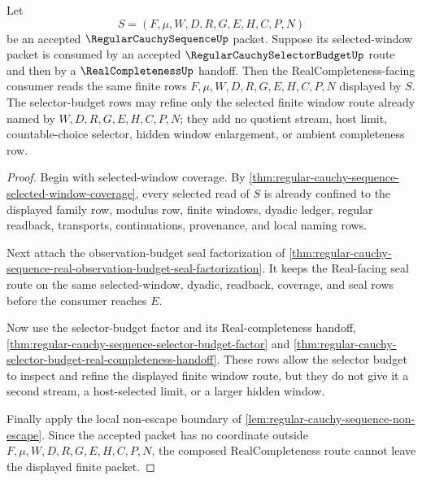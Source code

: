 \begin{theorem}
\label{thm:regular-cauchy-sequence-selector-budget-real-completeness-route}
Let
$$
S=(F,\mu,W,D,R,G,E,H,C,P,N)
$$
be an accepted $\RegularCauchySequenceUp$ packet. Suppose its selected-window packet is consumed by an accepted $\RegularCauchySelectorBudgetUp$ route and then by a $\RealCompletenessUp$ handoff. Then the RealCompleteness-facing consumer reads the same finite rows $F,\mu,W,D,R,G,E,H,C,P,N$ displayed by $S$. The selector-budget rows may refine only the selected finite window route already named by $W,D,R,G,E,H,C,P,N$; they add no quotient stream, host limit, countable-choice selector, hidden window enlargement, or ambient completeness row.
\end{theorem}
\begin{proof}
Begin with selected-window coverage. By \autoref{thm:regular-cauchy-sequence-selected-window-coverage}, every selected read of $S$ is already confined to the displayed family row, modulus row, finite windows, dyadic ledger, regular readback, transports, continuations, provenance, and local naming rows.

Next attach the observation-budget seal factorization of \autoref{thm:regular-cauchy-sequence-real-observation-budget-seal-factorization}. It keeps the Real-facing seal route on the same selected-window, dyadic, readback, coverage, and seal rows before the consumer reaches $E$.

Now use the selector-budget factor and its Real-completeness handoff, \autoref{thm:regular-cauchy-sequence-selector-budget-factor} and \autoref{thm:regular-cauchy-selector-budget-real-completeness-handoff}. These rows allow the selector budget to inspect and refine the displayed finite window route, but they do not give it a second stream, a host-selected limit, or a larger hidden window.

Finally apply the local non-escape boundary of \autoref{lem:regular-cauchy-sequence-non-escape}. Since the accepted packet has no coordinate outside $F,\mu,W,D,R,G,E,H,C,P,N$, the composed RealCompleteness route cannot leave the displayed finite packet.
\end{proof}

